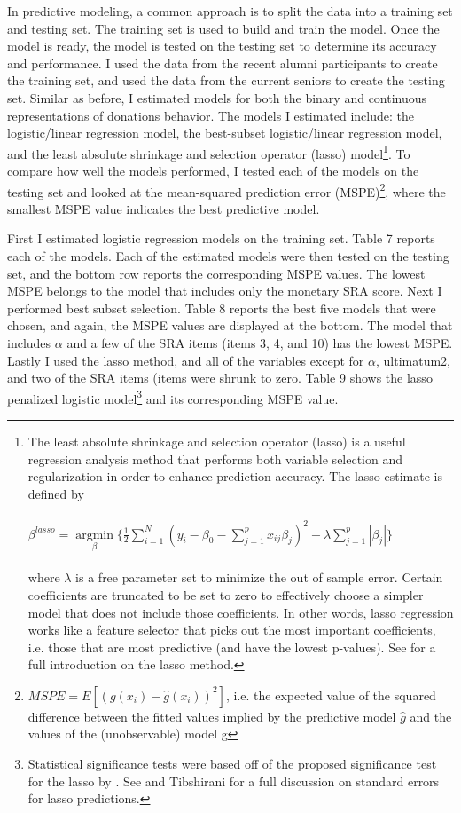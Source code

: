 \documentclass[12pt]{article}
\begin{document}
In predictive modeling, a common approach is to split the data into a training set and testing set. The training set is used to build and train the model. Once the model is ready, the model is tested on the testing set to determine its accuracy and performance. I used the data from the recent alumni participants to create the training set, and used the data from the current seniors to create the testing set. Similar as before, I estimated models for both the binary and continuous representations of donations behavior. The models I estimated include: the logistic/linear regression model, the best-subset logistic/linear regression model, and the least absolute shrinkage and selection operator (lasso) model\footnote{The least absolute shrinkage and selection operator (lasso) is a useful regression analysis method that performs both variable selection and regularization in order to enhance prediction accuracy. The lasso estimate is defined by\\ \\
\( \beta^{lasso}=\mathop\mathrm{argmin}\limits_{\beta} \{ \frac{1}{2} \sum_{i=1}^{N} (y_{i} - \beta_{0} - \sum_{j=1}^{p}x_{ij}\beta _{j})^{2}+\lambda\sum_{j=1}^{p}|\beta _{j}|\} \) \\ \\
where \(\lambda\) is a free parameter set to minimize the out of sample error. Certain coefficients are truncated to be set to zero to effectively choose a simpler model that does not include those coefficients. In other words, lasso regression works like a feature selector that picks out the most important coefficients, i.e. those that are most predictive (and have the lowest p-values). See \cite{tibshirani_1996} for a full introduction on the lasso method.}. To compare how well the models performed, I tested each of the models on the testing set and looked at the mean-squared prediction error (MSPE)\footnote{\(MSPE = E[(g(x_{i}) - \hat{g}(x_{i}))^{2}]\), i.e. the expected value of the squared difference between the fitted values implied by the predictive model \(\hat{g}\) and the values of the (unobservable) model g}, where the smallest MSPE value indicates the best predictive model.

First I estimated logistic regression models on the training set. Table 7 reports each of the models. Each of the estimated models were then tested on the testing set, and the bottom row reports the corresponding MSPE values. The lowest MSPE belongs to the model that includes only the monetary SRA score. Next I performed best subset selection. Table 8 reports the best five models that were chosen, and again, the MSPE values are displayed at the bottom. The model that includes \(\alpha\) and a few of the SRA items (items 3, 4, and 10) has the lowest MSPE. Lastly I used the lasso method, and all of the variables except for \(\alpha\), ultimatum2, and two of the SRA items (items were shrunk to zero. Table 9 shows the lasso penalized logistic model\footnote{Statistical significance tests were based off of the proposed significance test for the lasso by \cite{lockhart_2014}. See \cite{kyung_2010} and Tibshirani for a full discussion on standard errors for lasso predictions.} and its corresponding MSPE value.
\end{document}
